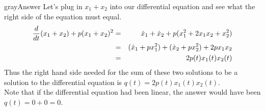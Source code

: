\begin{mybox}{gray}{Answer}
  Let's plug in $x_1 + x_2$ into our differential equation
  and see what the right side of the equation must equal.
  \begin{eqnarray*}
    \displaystyle  \frac{d}{dt}(x_1+x_2) + p(x_1+x_2)^2
    \displaystyle &=&  \dot x_1 + \dot x_2 + p(x_1^2 + 2x_1x_2 + x_2^2) \\
    \displaystyle &=& (\dot x_1+px_1^2) + (\dot x_2 +px_2^2) + 2px_1x_2 \\
    \displaystyle &=& 2p(t)x_1(t)x_2(t)
  \end{eqnarray*}
  Thus the right hand side needed for the sum of these two solutions
  to be a solution to the differential equation is $q(t) = 2p(t)x_1(t)x_2(t)$.\\

  Note that if the differential equation had been linear,
  the answer would have been $q(t) = 0 + 0 = 0$.
\end{mybox}

